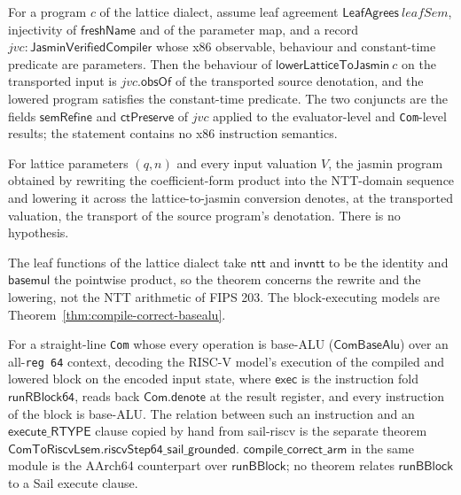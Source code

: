 \begin{theorem}
  \label{thm:robust-x86}
  \leanok
  For a program $c$ of the lattice dialect, assume leaf agreement
  $\mathsf{LeafAgrees}\ \mathit{leafSem}$, injectivity of $\mathsf{freshName}$ and of
  the parameter map, and a record $\mathit{jvc} : \mathsf{JasminVerifiedCompiler}$
  whose x86 observable, behaviour and constant-time predicate are parameters. Then the
  behaviour of $\mathsf{lowerLatticeToJasmin}\ c$ on the transported input is
  $\mathit{jvc}.\mathsf{obsOf}$ of the transported source denotation, and the lowered
  program satisfies the constant-time predicate. The two conjuncts are the fields
  $\mathsf{semRefine}$ and $\mathsf{ctPreserve}$ of $\mathit{jvc}$ applied to the
  evaluator-level and \texttt{Com}-level results; the statement contains no x86
  instruction semantics.
\end{theorem}

\begin{theorem}
  \label{thm:lattice-nttmul-compile-correct}
  \leanok
  For lattice parameters $(q,n)$ and every input valuation $V$, the jasmin
  program obtained by rewriting the coefficient-form product into the NTT-domain
  sequence and lowering it across the lattice-to-jasmin conversion denotes, at the
  transported valuation, the transport of the source program's denotation. There
  is no hypothesis.

  The leaf functions of the lattice dialect take $\mathsf{ntt}$ and
  $\mathsf{invntt}$ to be the identity and $\mathsf{basemul}$ the pointwise
  product, so the theorem concerns the rewrite and the lowering, not the NTT
  arithmetic of FIPS 203. The block-executing models are
  Theorem~\ref{thm:compile-correct-basealu}.
\end{theorem}

\begin{theorem}
  \label{thm:compile-correct-basealu}
  \leanok
  For a straight-line \texttt{Com} whose every operation is base-ALU
  ($\mathsf{ComBaseAlu}$) over an all-\texttt{reg 64} context, decoding the RISC-V
  model's execution of the compiled and lowered block on the encoded input state,
  where $\mathsf{exec}$ is the instruction fold $\mathsf{runRBlock64}$, reads back
  $\mathsf{Com.denote}$ at the result register, and every instruction of the block
  is base-ALU. The relation between such an instruction and an
  $\mathsf{execute\_RTYPE}$ clause copied by hand from sail-riscv is the separate
  theorem $\mathsf{ComToRiscvLsem.riscvStep64\_sail\_grounded}$.
  $\mathsf{compile\_correct\_arm}$ in the same module is the AArch64 counterpart over
  $\mathsf{runBBlock}$; no theorem relates $\mathsf{runBBlock}$ to a Sail execute
  clause.
\end{theorem}
